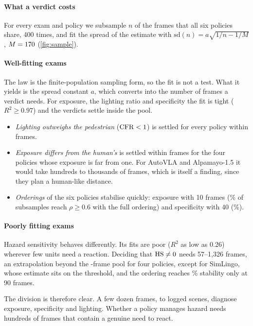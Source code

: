 \paragraph{What a verdict costs}
For every exam and policy we subsample $n$ of the \NumPool{} frames that all six policies share, 400
times, and fit the spread of the estimate with $\mathrm{sd}(n)=a\sqrt{1/n-1/M}$, $M=170$ (\cref{fig:sample}).

\paragraph{Well-fitting exams}
The law is the finite-population sampling form, so the fit is not a test. What it yields is the spread constant $a$, which converts into the number of frames a verdict needs. For exposure, the lighting ratio and specificity the fit is tight ($R^2\ge0.97$) and the verdicts settle inside the pool.
\begin{itemize}
\item \emph{Lighting outweighs the pedestrian} ($\mathrm{CFR}<1$) is settled for every policy within
      \NumNstarCFRhi{} frames.
\item \emph{Exposure differs from the human's} is settled within \NumNstarExpHi{} frames for the four
      policies whose exposure is far from one. For AutoVLA and Alpamayo-1.5 it would take hundreds to
      thousands of frames, which is itself a finding, since they plan a human-like distance.
\item \emph{Orderings} of the six policies stabilise quickly: exposure with 10 frames
      (\NumRankExpTen\% of subsamples reach $\rho\ge0.6$ with the full ordering) and specificity with
      40 (\NumRankSPforty\%).
\end{itemize}

\paragraph{Poorly fitting exams}
Hazard sensitivity behaves differently. Its fits are poor ($R^2$ as low as 0.26) wherever few units need a reaction. Deciding that $\mathrm{HS}\neq0$ needs 57--1{,}326 frames, an extrapolation beyond the \NumPool-frame pool for four policies, except for SimLingo, whose estimate sits on the threshold, and the ordering reaches \NumRankHSninety\% stability only at 90 frames.

The division is therefore clear. A few dozen frames, \NumScCFR{} to \NumScExp{} logged scenes, diagnose exposure, specificity and lighting. Whether a policy manages hazard needs hundreds of frames that contain a genuine need to react.
